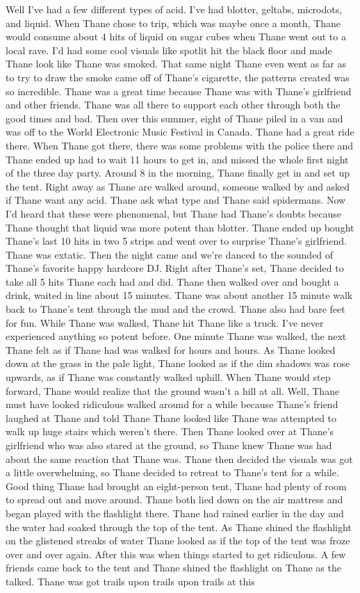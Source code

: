 \documentclass[12pt]{book}
\begin{document}
Well I've had a few different types of acid. I've had blotter, geltabs, microdots, and liquid. When Thane chose to trip, which was maybe once a month, Thane would consume about 4 hits of liquid on sugar cubes when Thane went out to a local rave. I'd had some cool visuals like spotlit hit the black floor and made Thane look like Thane was smoked. That same night Thane even went as far as to try to draw the smoke came off of Thane's cigarette, the patterns created was so incredible. Thane was a great time because Thane was with Thane's girlfriend and other friends. Thane was all there to support each other through both the good times and bad. Then over this summer, eight of Thane piled in a van and was off to the World Electronic Music Festival in Canada. Thane had a great ride there. When Thane got there, there was some problems with the police there and Thane ended up had to wait 11 hours to get in, and missed the whole first night of the three day party. Around 8 in the morning, Thane finally get in and set up the tent. Right away as Thane are walked around, someone walked by and asked if Thane want any acid. Thane ask what type and Thane said spidermans. Now I'd heard that these were phenomenal, but Thane had Thane's doubts because Thane thought that liquid was more potent than blotter. Thane ended up bought Thane's last 10 hits in two 5 strips and went over to surprise Thane's girlfriend. Thane was extatic. Then the night came and we're danced to the sounded of Thane's favorite happy hardcore DJ. Right after Thane's set, Thane decided to take all 5 hits Thane each had and did. Thane then walked over and bought a drink, waited in line about 15 minutes. Thane was about another 15 minute walk back to Thane's tent through the mud and the crowd. Thane also had bare feet for fun. While Thane was walked, Thane hit Thane like a truck. I've never experienced anything so potent before. One minute Thane was walked, the next Thane felt as if Thane had was walked for hours and hours. As Thane looked down at the grass in the pale light, Thane looked as if the dim shadows was rose upwards, as if Thane was constantly walked uphill. When Thane would step forward, Thane would realize that the ground wasn't a hill at all. Well, Thane must have looked ridiculous walked around for a while because Thane's friend laughed at Thane and told Thane Thane looked like Thane was attempted to walk up huge stairs which weren't there. Then Thane looked over at Thane's girlfriend who was also stared at the ground, so Thane knew Thane was had about the same reaction that Thane was. Thane then decided the visuals was got a little overwhelming, so Thane decided to retreat to Thane's tent for a while. Good thing Thane had brought an eight-person tent, Thane had plenty of room to spread out and move around. Thane both lied down on the air mattress and began played with the flashlight there. Thane had rained earlier in the day and the water had soaked through the top of the tent. As Thane shined the flashlight on the glistened streaks of water Thane looked as if the top of the tent was froze over and over again. After this was when things started to get ridiculous. A few friends came back to the tent and Thane shined the flashlight on Thane as the talked. Thane was got trails upon trails upon trails at this 
\end{document}
